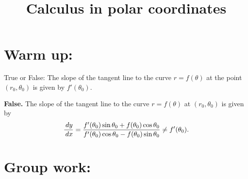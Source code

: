 \documentclass[]{ximera}
\title{Calculus in polar coordinates}
\begin{document}
\begin{abstract}		\end{abstract}
\maketitle



\section{Warm up:}
True or False:  The slope of the tangent line to the curve $r = f(\theta)$ at the point $(r_0, \theta_0)$ is given by $f'(\theta_0)$.  
	\begin{freeResponse}
	{\bf False.}  The slope of the tangent line to the curve $r = f(\theta)$ at $(r_0, \theta_0)$ is given by
		\[
		\frac{\,d y}{\,d x} = \frac{f'(\theta_0) \sin \theta_0 + f(\theta_0) \cos \theta_0}{f'(\theta_0) \cos \theta_0 - f(\theta_0) \sin \theta_0 } \neq f'(\theta_0).
		\]
	\end{freeResponse}
	
\begin{instructorNotes}
\end{instructorNotes}







\section{Group work:}
\end{document}
